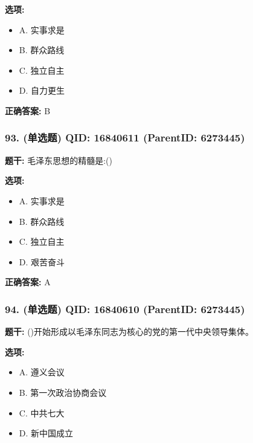 \documentclass[12pt,UTF8]{ctexart}
\begin{document}
\textbf{选项:}
\begin{itemize}[leftmargin=*]

  \item A. 实事求是

  \item B. 群众路线

  \item C. 独立自主

  \item D. 自力更生

\end{itemize}

\textbf{正确答案:}
B

\vspace{0.3em}\hrulefill\vspace{0.7em}

\subsubsection*{93. (单选题) \small QID: 16840611 (ParentID: 6273445)}

\textbf{题干:}
毛泽东思想的精髓是:()



\textbf{选项:}
\begin{itemize}[leftmargin=*]

  \item A. 实事求是

  \item B. 群众路线

  \item C. 独立自主

  \item D. 艰苦奋斗

\end{itemize}

\textbf{正确答案:}
A

\vspace{0.3em}\hrulefill\vspace{0.7em}

\subsubsection*{94. (单选题) \small QID: 16840610 (ParentID: 6273445)}

\textbf{题干:}
()开始形成以毛泽东同志为核心的党的第一代中央领导集体。



\textbf{选项:}
\begin{itemize}[leftmargin=*]

  \item A. 遵义会议

  \item B. 第一次政治协商会议

  \item C. 中共七大

  \item D. 新中国成立

\end{itemize}
\end{document}

